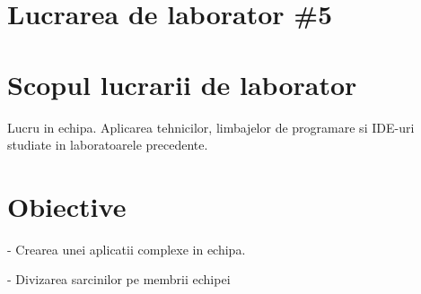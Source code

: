 
\section*{Lucrarea de laborator \#5}

\section{Scopul lucrarii de laborator}

Lucru in echipa. Aplicarea tehnicilor, limbajelor de programare si IDE-uri studiate in laboratoarele precedente.

\section{Obiective}


- Crearea unei aplicatii complexe in echipa.

- Divizarea sarcinilor pe membrii echipei

